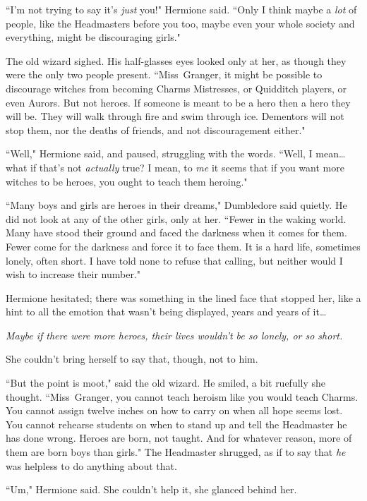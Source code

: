 ``I'm not trying to say it's \emph{just} you!" Hermione said. ``Only I think maybe a \emph{lot} of people, like the Headmasters before you too, maybe even your whole society and everything, might be discouraging girls."

The old wizard sighed. His half-glasses eyes looked only at her, as though they were the only two people present. ``Miss~Granger, it might be possible to discourage witches from becoming Charms Mistresses, or Quidditch players, or even Aurors. But not heroes. If someone is meant to be a hero then a hero they will be. They will walk through fire and swim through ice. Dementors will not stop them, nor the deaths of friends, and not discouragement either."

``Well," Hermione said, and paused, struggling with the words. ``Well, I mean{\ldots} what if that's not \emph{actually} true? I mean, to \emph{me} it seems that if you want more witches to be heroes, you ought to teach them heroing."

``Many boys and girls are heroes in their dreams," Dumbledore said quietly. He did not look at any of the other girls, only at her. ``Fewer in the waking world. Many have stood their ground and faced the darkness when it comes for them. Fewer come for the darkness and force it to face them. It is a hard life, sometimes lonely, often short. I have told none to refuse that calling, but neither would I wish to increase their number."

Hermione hesitated; there was something in the lined face that stopped her, like a hint to all the emotion that wasn't being displayed, years and years of it{\ldots}

\emph{Maybe if there were more heroes, their lives wouldn't be so lonely, or so short.}

She couldn't bring herself to say that, though, not to him.

``But the point is moot," said the old wizard. He smiled, a bit ruefully she thought. ``Miss~Granger, you cannot teach heroism like you would teach Charms. You cannot assign twelve inches on how to carry on when all hope seems lost. You cannot rehearse students on when to stand up and tell the Headmaster he has done wrong. Heroes are born, not taught. And for whatever reason, more of them are born boys than girls." The Headmaster shrugged, as if to say that \emph{he} was helpless to do anything about that.

``Um," Hermione said. She couldn't help it, she glanced behind her.

